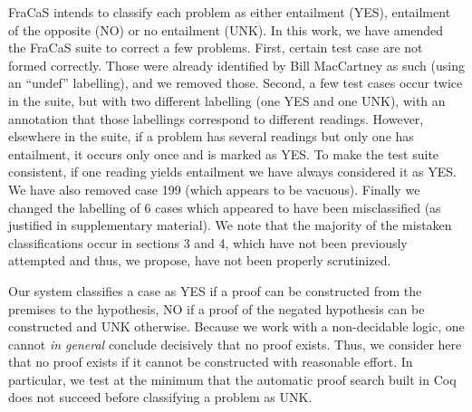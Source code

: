 \documentclass[11pt]{article}
\begin{document}
FraCaS intends to classify each problem as either entailment (YES),
entailment of the opposite (NO) or no entailment (UNK).  In this work,
we have amended the FraCaS suite to correct a few problems. First,
certain test case are not formed correctly. Those were already
identified by Bill MacCartney \citet{maccartney:2007} as such (using an ``undef''
labelling), and we removed those. Second, a few test cases occur twice
in the suite, but with two different labelling (one YES and one UNK),
with an annotation that those labellings correspond to different
readings. However, elsewhere in the suite, if a problem has several
readings but only one has entailment, it occurs only once and is
marked as YES. To make the test suite consistent, if one reading
yields entailment we have always considered it as YES. We have also
removed case 199 (which appears to be vacuous). Finally we changed the
labelling of 6 cases
which appeared to have been
misclassified (as justified in supplementary material). We note that the majority of the mistaken
classifications occur in sections 3 and 4, which have not been
previously attempted and thus, we propose, have not been properly
scrutinized.

Our system classifies a case as YES if a proof can be constructed from
the premises to the hypothesis, NO if a proof of the negated
hypothesis can be constructed and UNK otherwise. Because we work with
a non-decidable logic, one cannot \emph{in general} conclude
decisively that no proof exists. Thus, we consider here that no proof
exists if it cannot be constructed with reasonable effort. In
particular, we test at the minimum that the automatic proof search
built in Coq does not succeed before classifying a problem as UNK.
\end{document}
